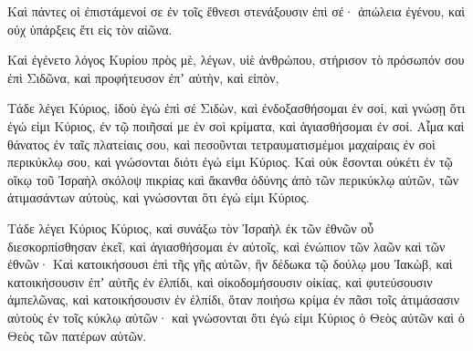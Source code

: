 {Καὶ πάντες οἱ ἐπιστάμενοί σε ἐν τοῖς ἔθνεσι στενάξουσιν ἐπὶ σέ· ἀπώλεια ἐγένου, καὶ οὐχ ὑπάρξεις ἔτι εἰς τὸν αἰῶνα.
\par }{\PP {}Καὶ ἐγένετο λόγος Κυρίου πρὸς μὲ, λέγων,
υἱὲ ἀνθρώπου, στήρισον τὸ πρόσωπόν σου ἐπὶ Σιδῶνα, καὶ προφήτευσον ἐπʼ αὐτὴν,
καὶ εἰπὸν,
\par }{\PP Τάδε λέγει Κύριος, ἰδοὺ ἐγὼ ἐπὶ σέ Σιδὼν, καὶ ἐνδοξασθήσομαι ἐν σοί, καὶ γνώσῃ ὅτι ἐγώ εἰμι Κύριος, ἐν τῷ ποιῆσαί με ἐν σοὶ κρίματα, καὶ ἁγιασθήσομαι ἐν σοί.
Αἷμα καὶ θάνατος ἐν ταῖς πλατείαις σου, καὶ πεσοῦνται τετραυματισμέμοι μαχαίραις ἐν σοὶ περικύκλῳ σου, καὶ γνώσονται διότι ἐγώ εἰμι Κύριος.
Καὶ οὐκ ἔσονται οὐκέτι ἐν τῷ οἴκῳ τοῦ Ἰσραὴλ σκόλοψ πικρίας καὶ ἄκανθα ὀδύνης ἀπὸ τῶν περικύκλῳ αὐτῶν, τῶν ἀτιμασάντων αὐτοὺς, καὶ γνώσονται ὅτι ἐγώ εἰμι Κύριος.
\par }{\PP {}Τάδε λέγει Κύριος Κύριος, καὶ συνάξω τὸν Ἰσραὴλ ἐκ τῶν ἐθνῶν οὗ διεσκορπίσθησαν ἐκεῖ, καὶ ἁγιασθήσομαι ἐν αὐτοῖς, καὶ ἐνώπιον τῶν λαῶν καὶ τῶν ἐθνῶν·
Καὶ κατοικήσουσι ἐπὶ τῆς γῆς αὐτῶν, ἣν δέδωκα τῷ δούλῳ μου Ἰακὼβ, καὶ κατοικήσουσιν ἐπʼ αὐτῆς ἐν ἐλπίδι, καὶ οἰκοδομήσουσιν οἰκίας, καὶ φυτεύσουσιν ἀμπελῶνας, καὶ κατοικήσουσιν ἐν ἐλπίδι, ὅταν ποιήσω κρίμα ἐν πᾶσι τοῖς ἀτιμάσασιν αὐτοὺς ἐν τοῖς κύκλῳ αὐτῶν· καὶ γνώσονται ὅτι ἐγώ εἰμι Κύριος ὁ Θεὸς αὐτῶν καὶ ὁ Θεὸς τῶν πατέρων αὐτῶν.

}
